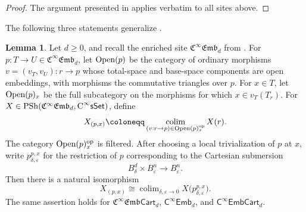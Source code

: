 \documentclass{amsart}
\newcommand{\cat}[1]{\mathsf{#1}}
\newcommand{\sset}{\cat{sSet}}
\DeclareMathOperator*{\colim}{colim}
\newcommand{\Open}{\textnormal{Open}}
\newcommand{\CsSet}{\textnormal{C}^{\infty}\sset}
\newcommand{\fembnoniso}[1]{\cat{C}^{\infty}\cat{Emb}_{#1}}
\newcommand{\fembcartnoniso}[1]{\cat{C}^{\infty}\cat{EmbCart}_{#1}}
\newcommand{\femb}[1]{\mathfrak{C}^{\infty}\mathfrak{Emb}_{#1}}
\newcommand{\fembcart}[1]{\mathfrak{C}^{\infty}\mathfrak{Emb}\cat{Cart}_{#1}}
\newcommand{\psh}{\mathrm{PSh}}
\renewcommand{\op}{\mathrm{op}}
\theoremstyle{definition}
\newtheorem{lemma}[equation]{Lemma}
\numberwithin{equation}{subsection}
\numberwithin{subsubsection}{subsection}
\begin{document}
\begin{proof}
  The argument presented in \cite[Theorem~5.8~and~Theorem~5.9]{GM26} applies
  verbatim to all sites above.
\end{proof}

The following three statements generalize
\cite[Proposition~3.1.1]{GP23}.

\begin{lemma}\label{lem:femb.stalk.local.trivialization}
  Let \(d\geq0\), and recall the enriched site \(\femb{d}\) from
  . For \(p:T\to U\in\femb{d}\), let \(\Open(p)\) be the
  category of ordinary morphisms \(v=(v_T,v_U):r\to p\) whose total-space
  and base-space components are open embeddings, with morphisms the
  commutative triangles over \(p\). For \(x\in T\), let \(\Open(p)_x\) be
  the full subcategory on the morphisms for which \(x\in v_T(T_r)\). For
  \(X\in\psh(\femb{d},\CsSet)\), define
  \[
    X_{(p,x)}
    \coloneqq
    \colim_{(v:r\to p)\in\Open(p)_x^{\op}}X(r).
  \]
  The category \(\Open(p)_x^{\op}\) is filtered. After choosing a local
  trivialization of \(p\) at \(x\), write
  \(p^{p,x}_{\delta,\varepsilon}\) for the restriction of \(p\)
  corresponding to the Cartesian submersion
  \[
    B^d_\delta\times B^n_\varepsilon\longrightarrow B^n_\varepsilon.
  \]
  Then there is a natural isomorphism
  \[
    X_{(p,x)}
    \cong
    \colim_{\delta,\varepsilon\to0}
    X\bigl(p^{p,x}_{\delta,\varepsilon}\bigr).
  \]
  The same assertion holds for \(\fembcart{d}\), \(\fembnoniso{d}\), and
  \(\fembcartnoniso{d}\).
\end{lemma}
\end{document}

